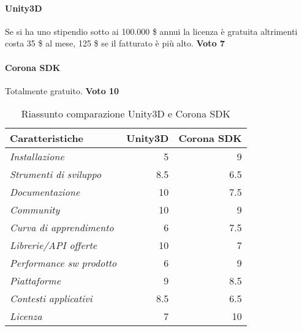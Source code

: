 		\paragraph{Unity3D} Se si ha uno stipendio sotto ai 100.000 \$ annui la licenza è gratuita altrimenti costa 35 \$ al mese, 125 \$ se il fatturato è più alto. \textbf{Voto 7}
		\paragraph{Corona SDK} Totalmente gratuito. \textbf{Voto 10}
		
		
	\begin{table}
		\centering
		\begin{tabular}{lrr}
			\toprule
			\textbf{Caratteristiche} & \textbf{Unity3D} & \textbf{Corona SDK} \\
			\toprule
			\emph{Installazione} & 5 & 9 \\
			
			\emph{Strumenti di sviluppo} & 8.5 & 6.5 \\
			
			\emph{Documentazione} & 10 & 7.5 \\
			
			\emph{Community} & 10 & 9 \\
			
			\emph{Curva di apprendimento} & 6 & 7.5 \\
			
			\emph{Librerie/API offerte} & 10 & 7 \\
			
			\emph{Performance sw prodotto} & 6 & 9 \\
			
			\emph{Piattaforme} & 9 & 8.5 \\
			
			\emph{Contesti applicativi} & 8.5 & 6.5 \\
			
			\emph{Licenza} & 7 & 10 \\
			
			\bottomrule
		\end{tabular}
		\caption{Riassunto comparazione Unity3D e Corona SDK}
	\end{table}
	
	

